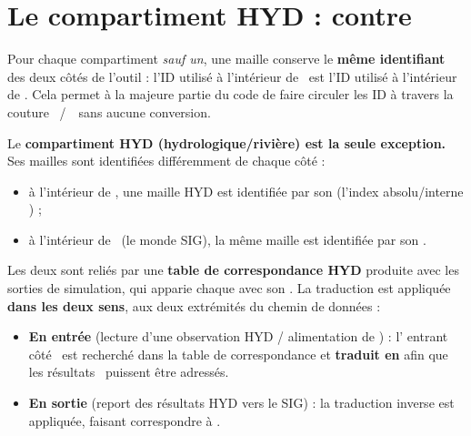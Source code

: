 
\section{Le compartiment HYD : \texorpdfstring{}{ID\_ABS} contre
\texorpdfstring{}{ID\_GIS}}
\label{sec-hyd-id-translation}

Pour chaque compartiment \emph{sauf un}, une maille conserve le \textbf{même identifiant} des deux côtés de l'outil : l'ID utilisé à l'intérieur de \cawaqs~est l'ID utilisé à l'intérieur de \cwv. Cela permet à la majeure partie du code de faire circuler les ID à travers la couture \cawaqs~/~\cwv~sans aucune conversion.

Le \textbf{compartiment HYD (hydrologique/rivière) est la seule exception.} Ses mailles sont identifiées différemment de chaque côté :

\begin{itemize}
    \item à l'intérieur de \cawaqs, une maille HYD est identifiée par son \textbf{} (l'index absolu/interne \cawaqs) ;
    \item à l'intérieur de \cwv~(le monde SIG), la même maille est identifiée par son \textbf{}.
\end{itemize}

Les deux sont reliés par une \textbf{table de correspondance HYD} produite avec les sorties de simulation, qui apparie chaque  avec son . La traduction est appliquée \textbf{dans les deux sens}, aux deux extrémités du chemin de données :

\begin{itemize}
    \item \textbf{En entrée} (lecture d'une observation HYD / alimentation de \cwv) : l' entrant côté \cwv~est recherché dans la table de correspondance et \textbf{traduit en } afin que les résultats \cawaqs~puissent être adressés.
    \item \textbf{En sortie} (report des résultats HYD vers le SIG) : la traduction inverse est appliquée, faisant correspondre  à .
\end{itemize}

